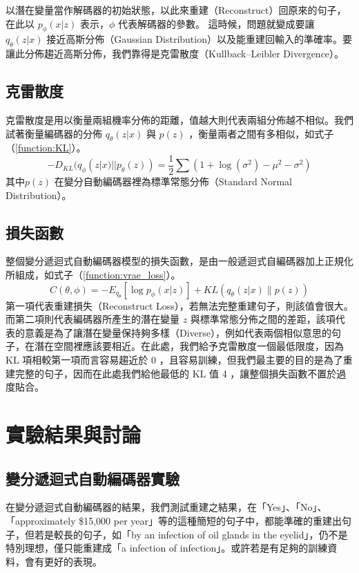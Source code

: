 以潛在變量當作解碼器的初始狀態，以此來重建（Reconstruct）回原來的句子，在此以 $p_\phi(x|z)$ 表示，$\phi$ 代表解碼器的參數。
這時候，問題就變成要讓 $q_\theta(z|x)$ 接近高斯分佈（Gaussian Distribution）以及能重建回輸入的準確率。要讓此分佈趨近高斯分佈，我們靠得是克雷散度（Kullback–Leibler Divergence）。
\subsection{克雷散度}
克雷散度是用以衡量兩組機率分佈的距離，值越大則代表兩組分佈越不相似。我們試著衡量編碼器的分佈 $q_\theta(z|x)$ 與 $p(z)$ ，衡量兩者之間有多相似，如式子（\ref{function:KL}）。
\begin{equation}
    -D_{KL}(q_\phi(z|x)|| p_\theta(z) ) = \frac{1}{2} \sum(1+\log(\sigma^2) - \mu^2 - \sigma^2)
    \label{function:KL}
\end{equation}
其中$p(z)$ 在變分自動編碼器裡為標準常態分佈（Standard Normal Distribution）。
\subsection{損失函數}
整個變分遞迴式自動編碼器模型的損失函數，是由一般遞迴式自編碼器加上正規化所組成，如式子（\ref{function:vrae_loss}）。
\begin{equation}
    C(\theta, \phi) = -E_{q_{\theta}}[\log p_\phi(x|z)] + KL(q_\theta(z|x) \| p(z))
    \label{function:vrae_loss}
\end{equation}
第一項代表重建損失（Reconstruct Loss），若無法完整重建句子，則該值會很大。
而第二項則代表編碼器所產生的潛在變量 $z$ 與標準常態分佈之間的差距，該項代表的意義是為了讓潛在變量保持夠多樣（Diverse），例如代表兩個相似意思的句子，在潛在空間裡應該要相近。在此處，我們給予克雷散度一個最低限度，因為 KL 項相較第一項而言容易趨近於 0 ，且容易訓練，但我們最主要的目的是為了重建完整的句子，因而在此處我們給他最低的 KL 值 4 ，讓整個損失函數不置於過度貼合。

\section{實驗結果與討論}
\subsection{變分遞迴式自動編碼器實驗}
在變分遞迴式自動編碼器的結果，我們測試重建之結果，在「Yes」、「No」、「approximately \$15,000 per year」等的這種簡短的句子中，都能準確的重建出句子，但若是較長的句子，如「by an infection of oil glands in the eyelid」，仍不是特別理想，僅只能重建成「a infection of infection」。或許若是有足夠的訓練資料，會有更好的表現。
